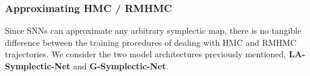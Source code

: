 \documentclass{article}
\theoremstyle{plain}
\theoremstyle{definition}
\theoremstyle{remark}
\begin{document}
\subsubsection{Approximating HMC / RMHMC}
Since SNNs can approximate any arbitrary symplectic map, there is no tangible difference between the training procedures of dealing with HMC and RMHMC trajectories. We consider the two model architectures previously mentioned, \textbf{LA-Symplectic-Net} and \textbf{G-Symplectic-Net}.

 












\end{document}
